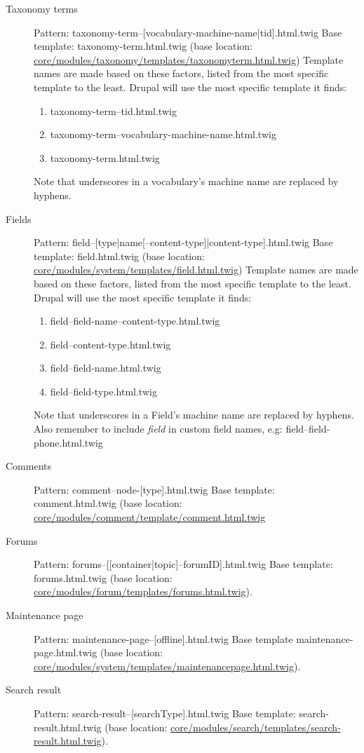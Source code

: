 \begin{description}
	\item[Taxonomy terms] Pattern: taxonomy-term--[vocabulary-machine-name|tid].html.twig
	Base template: taxonomy-term.html.twig (base location:
	\url{core/modules/taxonomy/templates/taxonomy­term.html.twig})
	Template names are made based on these factors, listed from the most specific template to the least. Drupal will use the most specific template it finds:
	\begin{enumerate}
		\item taxonomy-term--tid.html.twig
		\item taxonomy-term--vocabulary-machine-name.html.twig
		\item taxonomy-term.html.twig
	\end{enumerate}
	Note that underscores in a vocabulary's machine name are replaced by hyphens.

	\item[Fields] Pattern: field--[type|name[--content-type]|content-type].html.twig
	Base template: field.html.twig (base location: \url{core/modules/system/templates/field.html.twig})
	Template names are made based on these factors, listed from the most specific template to the least. Drupal will use the most specific template it finds:
	\begin{enumerate}
		\item field--field-name--content-type.html.twig
		\item field--content-type.html.twig
		\item field--field-name.html.twig
		\item field--field-type.html.twig
	\end{enumerate}
	Note that underscores in a Field's machine name are replaced by hyphens. Also remember to include \textit{field} in custom field names, e.g: field--field-phone.html.twig

	\item[Comments] Pattern: comment--node-[type].html.twig
	Base template: comment.html.twig (base location:
	\url{core/modules/comment/template/comment.html.twig}
	
	\item[Forums] Pattern: forums--[[container|topic]--forumID].html.twig
	Base template: forums.html.twig (base location: \url{core/modules/forum/templates/forums.html.twig}).
	
	\item[Maintenance page] Pattern: maintenance-page--[offline].html.twig
	Base template maintenance-page.html.twig (base location: \url{core/modules/system/templates/maintenance­page.html.twig}).
	
	\item[Search result] Pattern: search-result--[searchType].html.twig
	Base template: search-result.html.twig (base location: \url{core/modules/search/templates/search­result.html.twig}).


\end{description}

